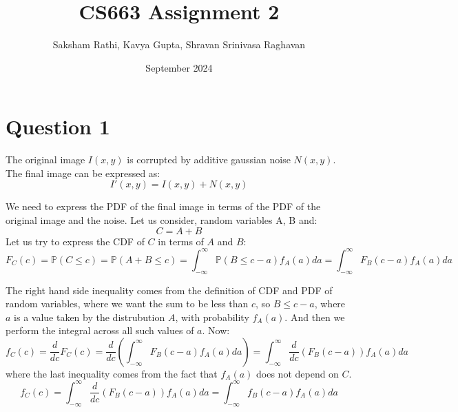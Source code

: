 \documentclass[12pt]{article}
\title{{\bf CS663 Assignment 2}}
\author{Saksham Rathi, Kavya Gupta, Shravan Srinivasa Raghavan}
\date{September 2024}
\begin{document}
\maketitle
\clearpage
\tableofcontents
\clearpage
\section*{Question 1}
The original image $I(x, y)$ is corrupted by additive gaussian noise $N(x, y)$. The final image can be expressed as:
\[I'(x, y) = I(x, y) + N(x, y)\]

We need to express the PDF of the final image in terms of the PDF of the original image and the noise. Let us consider, random variables A, B and:
\[C = A + B\]
Let us try to express the CDF of $C$ in terms of $A$ and $B$:
\[F_C(c) = \mathbb{P}(C \leq c) = \mathbb{P}(A+ B \leq c) = \int_{-\infty}^\infty \mathbb{P}(B \leq c - a)f_A(a)da = \int_{-\infty}^\infty F_B(c-a)f_A(a)da\]

The right hand side inequality comes from the definition of CDF and PDF of random variables, where we want the sum to be less than $c$, so $B\leq c-a$, where $a$ is a value taken by the distrubution $A$, with probability $f_A(a)$. And then we perform the integral across all such values of $a$. Now:
\[f_C(c) = \frac{d}{dc}F_C(c) = \frac{d}{dc}(\int_{-\infty}^\infty F_B(c-a)f_A(a)da) = \int_{-\infty}^\infty \frac{d}{dc}(F_B(c-a))f_A(a)da\]
where the last inequality comes from the fact that $f_A(a)$ does not depend on $C$.
\[f_C(c) = \int_{-\infty}^\infty \frac{d}{dc}(F_B(c-a))f_A(a)da = \int_{-\infty}^\infty f_B(c-a)f_A(a)da\]
\end{document}
